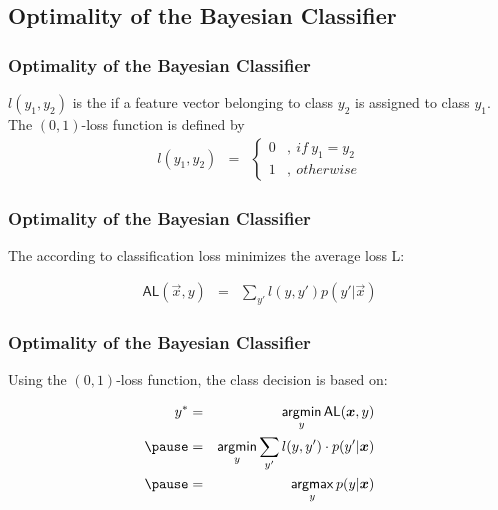 \subsection{Optimality of the Bayesian Classifier}

\begin{frame}
	\frametitle{Optimality of the Bayesian Classifier}

	\begin{definition}
		$l(y_{1},y_{2})$ is the  if a feature vector belonging to class $y_{2}$
		is assigned to class $y_{1}$. The $(0,1)$-loss function is defined by
		\begin{eqnarray*}
			l(y_{1},y_{2}) &= &\left\{ \begin{array}{cc}
				0 & ,\ if\ y_{1}=y_{2} \\
				1 & ,\ otherwise
			\end{array} \right.
		\end{eqnarray*}
	\end{definition}
\end{frame}


\begin{frame}
	\frametitle{Optimality of the Bayesian Classifier \cont}

	The  according to classification loss minimizes the average loss L:

	\begin{eqnarray*}
		\mathsf{AL}(\vec x , y) &=& \sum\limits_{y'}l(y,y')p(y'|\vec x)
	\end{eqnarray*}

\end{frame}


\begin{frame}
	\frametitle{Optimality of the Bayesian Classifier \cont}

	Using the $(0,1)$-loss function, the class decision is based on:

	\begin{eqnarray*}
		y^* &=& \argmin\limits_{y} \mathsf{AL}(\vec x, y)\\
		\pause  &=& \argmin\limits_{y} \sum\limits_{y'} l(y,y') \cdot p(y'|\vec x)\\
		\pause  &=& \argmax\limits_{y} p(y|\vec x)\\
	\end{eqnarray*}
\end{frame}


